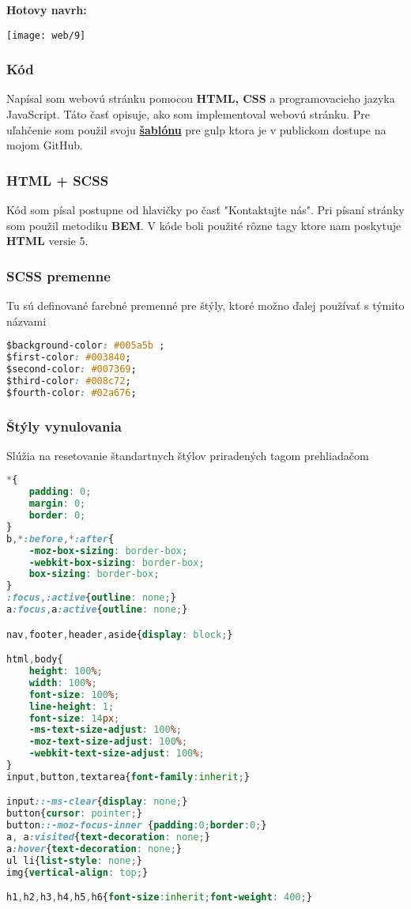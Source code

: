       \newpage

      \begin{center}
        \textbf{Hotovy navrh:}

        \texttt{[image: web/9]}
      \end{center}

      \subsubsection{Kód}
      Napísal som webovú stránku pomocou \textbf{HTML, CSS} a programovacieho jazyka JavaScript. Táto časť opisuje, ako som implementoval webovú stránku.
      Pre uľahčenie som použil svoju \textbf{\href{https://github.com/SerMeliodas/gulp-template}{šablónu}} pre gulp ktora je v publickom dostupe na mojom GitHub.

      \subsubsection*{HTML + SCSS}

      Kód som písal postupne od hlavičky po časť "Kontaktujte nás". Pri písaní stránky som použil metodiku \textbf{BEM}.
      V kóde boli použité rôzne tagy ktore nam poskytuje \textbf{HTML} versie 5.

      \subsubsection*{SCSS premenne}
      Tu sú definované farebné premenné pre štýly, ktoré možno ďalej používať s týmito názvami
\begin{lstlisting}[language=css]
$background-color: #005a5b ;
$first-color: #003840;
$second-color: #007369;
$third-color: #008c72;
$fourth-color: #02a676;
\end{lstlisting}

      \subsubsection*{Štýly vynulovania} Slúžia na resetovanie štandartnych štýlov priradených tagom prehliadačom
\begin{lstlisting}[language=css]
*{
	padding: 0;
	margin: 0;
	border: 0;
}
b,*:before,*:after{
	-moz-box-sizing: border-box;
	-webkit-box-sizing: border-box;
	box-sizing: border-box;
}
:focus,:active{outline: none;}
a:focus,a:active{outline: none;}

nav,footer,header,aside{display: block;}

html,body{
	height: 100%;
	width: 100%;
	font-size: 100%;
	line-height: 1;
	font-size: 14px;
	-ms-text-size-adjust: 100%;
	-moz-text-size-adjust: 100%;
	-webkit-text-size-adjust: 100%;
}
input,button,textarea{font-family:inherit;}

input::-ms-clear{display: none;}
button{cursor: pointer;}
button::-moz-focus-inner {padding:0;border:0;}
a, a:visited{text-decoration: none;}
a:hover{text-decoration: none;}
ul li{list-style: none;}
img{vertical-align: top;}

h1,h2,h3,h4,h5,h6{font-size:inherit;font-weight: 400;}
\end{lstlisting}

